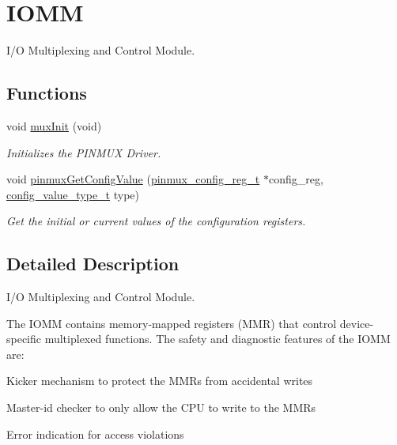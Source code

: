 \hypertarget{group__IOMM}{}\section{I\+O\+MM}
\label{group__IOMM}


I/O Multiplexing and Control Module.  


\subsection*{Functions}
\begin{DoxyCompactItemize}
\item 
void \mbox{\hyperlink{group__IOMM_ga8fac89d371c9be80b507da3c31144423}{mux\+Init}} (void)
\begin{DoxyCompactList}\small\item\em Initializes the P\+I\+N\+M\+UX Driver. \end{DoxyCompactList}\item 
void \mbox{\hyperlink{group__IOMM_gae1d5925bc43dd10efb0529ed8fea7e5d}{pinmux\+Get\+Config\+Value}} (\mbox{\hyperlink{structpinmux__config__reg}{pinmux\+\_\+config\+\_\+reg\+\_\+t}} $\ast$config\+\_\+reg, \mbox{\hyperlink{sys__common_8h_a9daf9a5992391b058477d28d107ee5e2}{config\+\_\+value\+\_\+type\+\_\+t}} type)
\begin{DoxyCompactList}\small\item\em Get the initial or current values of the configuration registers. \end{DoxyCompactList}\end{DoxyCompactItemize}


\subsection{Detailed Description}
I/O Multiplexing and Control Module. 

The I\+O\+MM contains memory-\/mapped registers (M\+MR) that control device-\/specific multiplexed functions. The safety and diagnostic features of the I\+O\+MM are\+:
\begin{DoxyItemize}
\item Kicker mechanism to protect the M\+M\+Rs from accidental writes
\item Master-\/id checker to only allow the C\+PU to write to the M\+M\+Rs
\item Error indication for access violations
\end{DoxyItemize}


